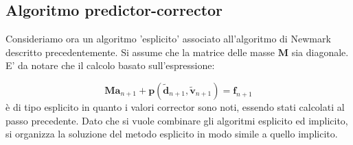 \subsection{Algoritmo predictor-corrector}
Consideriamo ora un algoritmo 'esplicito' associato all'algoritmo di Newmark descritto precedentemente. Si assume che la matrice delle masse $\boldsymbol{M}$ sia diagonale. E' da notare che il calcolo basato sull'espressione:

\begin{equation}
	\boldsymbol{M a}_{n+1} + \boldsymbol{p} (\tilde{\boldsymbol{d}}_{n+1}, \tilde{\boldsymbol{v}}_{n+1}) = \boldsymbol{f}_{n+1}
\end{equation}
è di tipo esplicito in quanto i valori corrector sono noti, essendo stati calcolati al passo precedente. Dato che si vuole combinare gli algoritmi esplicito ed implicito, si organizza la soluzione del metodo esplicito in modo simile a quello implicito.

